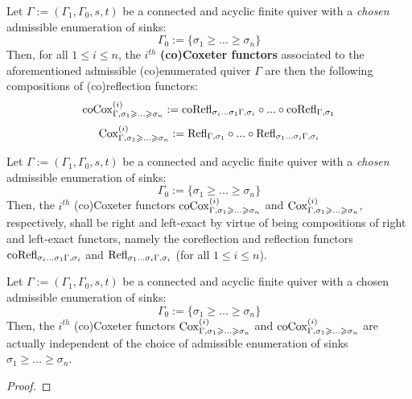             \begin{definition} \label{def: coxeter_functors}
                Let $\Gamma := (\Gamma_1, \Gamma_0, s, t)$ be a connected and acyclic finite quiver with a \textit{chosen} admissible enumeration of sinks:
                    $$\Gamma_0 := \{\sigma_1 \geq ... \geq \sigma_n\}$$
                Then, for all $1 \leq i \leq n$, the $i^{th}$ \textbf{(co)Coxeter functors} associated to the aforementioned admissible (co)enumerated quiver $\Gamma$ are then the following compositions of (co)reflection functors:
                    $$\mathrm{co}\mathrm{Cox}_{\Gamma, \sigma_1 \geqslant ...\geqslant \sigma_n}^{(i)} := \mathrm{co}\mathrm{Refl}_{\sigma_i ... \sigma_1 \Gamma, \sigma_i} \circ ... \circ \mathrm{co}\mathrm{Refl}_{\Gamma, \sigma_1}$$
                    $$\mathrm{Cox}_{\Gamma, \sigma_1 \geqslant ...\geqslant \sigma_n}^{(i)} := \mathrm{Refl}_{\Gamma, \sigma_1} \circ ... \circ \mathrm{Refl}_{\sigma_1 ... \sigma_i \Gamma, \sigma_i}$$
            \end{definition}
            \begin{remark}
                Let $\Gamma := (\Gamma_1, \Gamma_0, s, t)$ be a connected and acyclic finite quiver with a \textit{chosen} admissible enumeration of sinks:
                    $$\Gamma_0 := \{\sigma_1 \geq ... \geq \sigma_n\}$$
                Then, the $i^{th}$ (co)Coxeter functors $\mathrm{co}\mathrm{Cox}^{(i)}_{\Gamma, \sigma_1 \geqslant ...\geqslant \sigma_n}$ and $\mathrm{Cox}^{(i)}_{\Gamma, \sigma_1 \geqslant ...\geqslant \sigma_n}$, respectively, shall be right and left-exact by virtue of being compositions of right and left-exact functors, namely the coreflection and reflection functors $\mathrm{co}\mathrm{Refl}_{\sigma_i ... \sigma_1 \Gamma, \sigma_i}$ and $\mathrm{Refl}_{\sigma_1 ... \sigma_i \Gamma, \sigma_i}$ (for all $1 \leq i \leq n$).
            \end{remark}
            \begin{proposition} \label{prop: coxeter_functors_are_independent_of_admissible_enumerations}
                Let $\Gamma := (\Gamma_1, \Gamma_0, s, t)$ be a connected and acyclic finite quiver with a chosen admissible enumeration of sinks:
                    $$\Gamma_0 := \{\sigma_1 \geq ... \geq \sigma_n\}$$
                Then, the $i^{th}$ (co)Coxeter functors $\mathrm{Cox}^{(i)}_{\Gamma, \sigma_1 \geqslant ...\geqslant \sigma_n}$ and $\mathrm{co}\mathrm{Cox}^{(i)}_{\Gamma, \sigma_1 \geqslant ...\geqslant \sigma_n}$ are actually independent of the choice of admissible enumeration of sinks $\sigma_1 \geq ... \geq \sigma_n$. 
            \end{proposition}
                \begin{proof}
                    
                \end{proof}

